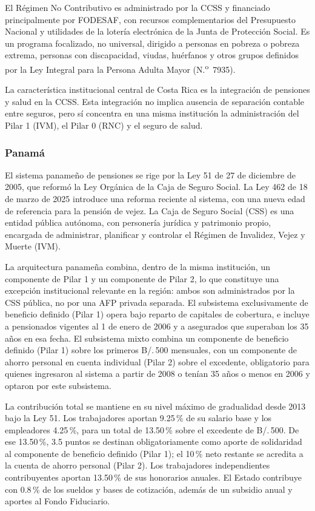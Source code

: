 \documentclass[12pt, letterpaper]{article}
\begin{document}
El Régimen No Contributivo es administrado por la CCSS y financiado principalmente por FODESAF, con recursos complementarios del Presupuesto Nacional y utilidades de la lotería electrónica de la Junta de Protección Social. Es un programa focalizado, no universal, dirigido a personas en pobreza o pobreza extrema, personas con discapacidad, viudas, huérfanos y otros grupos definidos por la Ley Integral para la Persona Adulta Mayor (N.\textsuperscript{o}~7935).

La característica institucional central de Costa Rica es la integración de pensiones y salud en la CCSS. Esta integración no implica ausencia de separación contable entre seguros, pero sí concentra en una misma institución la administración del Pilar 1 (IVM), el Pilar 0 (RNC) y el seguro de salud.

\subsubsection{Panamá}

El sistema panameño de pensiones se rige por la Ley 51 de 27 de diciembre de 2005, que reformó la Ley Orgánica de la Caja de Seguro Social. La Ley 462 de 18 de marzo de 2025 introduce una reforma reciente al sistema, con una nueva edad de referencia para la pensión de vejez. La Caja de Seguro Social (CSS) es una entidad pública autónoma, con personería jurídica y patrimonio propio, encargada de administrar, planificar y controlar el Régimen de Invalidez, Vejez y Muerte (IVM).

La arquitectura panameña combina, dentro de la misma institución, un componente de Pilar 1 y un componente de Pilar 2, lo que constituye una excepción institucional relevante en la región: ambos son administrados por la CSS pública, no por una AFP privada separada. El subsistema exclusivamente de beneficio definido (Pilar 1) opera bajo reparto de capitales de cobertura, e incluye a pensionados vigentes al 1 de enero de 2006 y a asegurados que superaban los 35 años en esa fecha. El subsistema mixto combina un componente de beneficio definido (Pilar 1) sobre los primeros B/.\,500 mensuales, con un componente de ahorro personal en cuenta individual (Pilar 2) sobre el excedente, obligatorio para quienes ingresaron al sistema a partir de 2008 o tenían 35 años o menos en 2006 y optaron por este subsistema.

La contribución total se mantiene en su nivel máximo de gradualidad desde 2013 bajo la Ley 51. Los trabajadores aportan 9.25\,\% de su salario base y los empleadores 4.25\,\%, para un total de 13.50\,\% sobre el excedente de B/.\,500. De ese 13.50\,\%, 3.5 puntos se destinan obligatoriamente como aporte de solidaridad al componente de beneficio definido (Pilar 1); el 10\,\% neto restante se acredita a la cuenta de ahorro personal (Pilar 2). Los trabajadores independientes contribuyentes aportan 13.50\,\% de sus honorarios anuales. El Estado contribuye con 0.8\,\% de los sueldos y bases de cotización, además de un subsidio anual y aportes al Fondo Fiduciario.
\end{document}
